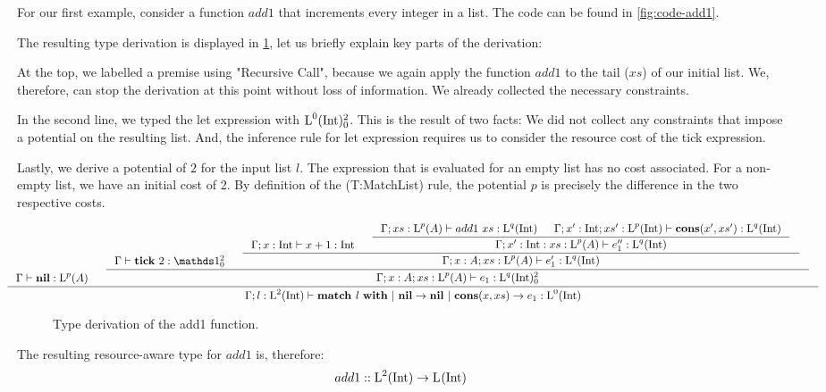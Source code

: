 \begin{example}
   For our first example, consider a function \(add1\) that increments every integer in a list. The code can be found in \cref{fig:code-add1}.

The resulting type derivation is displayed in \cref{fig:type-derivation-add1}, let us briefly explain key parts of the derivation:

At the top, we labelled a premise using "Recursive Call", because we again apply the function \(add1\) to the tail (\(xs\)) of our initial list. We, therefore, can stop the derivation at this point without loss of information. We already collected the necessary constraints.

In the second line, we typed the let expression with \(\text{L}^{0}(\text{Int}) ^{2}_{0}\). This is the result of two facts: We did not collect any constraints that impose a potential on the resulting list. And, the inference rule for let expression requires us to consider the resource cost of the tick expression. 

Lastly, we derive a potential of \(2\) for the input list \(l\). The expression that is evaluated for an empty list has no cost associated. For a non-empty list, we have an initial cost of 2. By definition of the (T:MatchList) rule, the potential \(p\) is precisely the difference in the two respective costs.

\begin{sidewaysfigure}
\begin{figure}[H]
   \[
      \hspace*{-1.5cm}
      \inference
      {
         \typing{\Gamma}{\listnil}{\ralist{p}{A}} 
         &
         \inference
         {
            \typing{\Gamma}{\tick{2}}{\ratype{\unit}{2}{0}}
            &
            \inference
            {
               \typing{\Gamma;x:\typeint}{x + 1}{\typeint}
               &
               \inference
               {
                  \typing{\Gamma;xs:\ralist{p}{A}}{add1~xs}{\ralist{q}{\typeint}}
                  &
                  \typing{\Gamma;x':\typeint;xs':\ralist{p}{\typeint}}{\cons{x'}{xs'}}{\ralist{q}{\typeint}}  
               }
               {
                  \typing{\Gamma;x':\typeint:xs:\ralist{p}{A}}{e_1''}{\ralist{q}{\typeint}}
               }
            }
            {
               \typing{\Gamma;x:A;xs:\ralist{p}{A}}{e_1'}{\ralist{q}{\typeint}}
            }
         }
         {
            \typing{\Gamma;x:A;xs:\ralist{p}{A}}{e_1}{\ratype{\ralist{q}{\typeint}}{2}{0}}
         }
      }
      {
         \typing{\Gamma;l : \ralist{2}{\typeint}}{\listmatch{l}{\listnil}{e_1}}{\ralist{0}{\typeint}}
      }
   \]
   \caption{Type derivation of the add1 function.}
   \label{fig:type-derivation-add1}
\end{figure}
\end{sidewaysfigure}

The resulting resource-aware type for \(add1\) is, therefore:
\[
   add1 :: \text{L}^{2}(\text{Int}) \to \text{L}^{}(\text{Int}) ^{}_{}
\]
\end{example}

